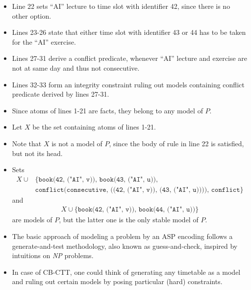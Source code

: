 \documentclass{easychair}
\newcommand{\CBCTT}{CB-CTT}
\newcommand{\ASP}{ASP}
\begin{document}
\begin{itemize}
  \item%
  Line 22 sets ``AI'' lecture to time slot with identifier 42, since there is no other option. 
  \item%
  Lines 23-26 state that either time slot with identifier 43 or 44 has to be taken for the ``AI'' exercise. 
  \item%
  Lines 27-31 derive a conflict predicate, whenever ``AI'' lecture and exercise are not at same day and thus not consecutive. 
  \item%
  Lines 32-33 form an integrity constraint ruling out models containing conflict predicate derived by lines 27-31. 
  \item%
  Since atoms of lines 1-21 are facts, they belong to any model of $P$. 
  \item%
  Let $X$ be the set containing atoms of lines 1-21. 
  \item%
  Note that $X$ is not a model of $P$, since the body of rule in line 22 is satisfied, but not its head. 
  \item%
  Sets 
  \begin{align*}
    X\cup&\{\texttt{book(42, ("AI", v)), book(43, ("AI", u)),} \\
         &\texttt{conflict(consecutive, ((42, ("AI", v)), (43, ("AI", u)))), conflict}\}
  \end{align*} 
  and 
  \begin{align*}
    X\cup\{\texttt{book(42, ("AI", v)), book(44, ("AI", u))}\}
  \end{align*} 
  are models of $P$, but the latter one is the only stable model of $P$. \\
  \item%
  The basic approach of modeling a problem by an \ASP{} encoding follows a generate-and-test methodology, also known as guess-and-check, inspired by intuitions on \textit{NP} problems. 
  \item%
  In case of \CBCTT{}, one could think of generating any timetable as a model and ruling out certain models by posing particular (hard) constraints. 
\end{itemize}%
\end{document}
